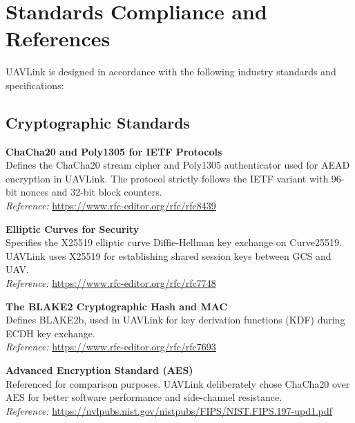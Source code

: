 \documentclass[11pt,a4paper]{article}
\begin{document}
\section{Standards Compliance and References}

UAVLink is designed in accordance with the following industry standards and specifications:

\subsection{Cryptographic Standards}

\begin{description}[style=nextline]
\item[RFC 8439] \textbf{ChaCha20 and Poly1305 for IETF Protocols} \\
Defines the ChaCha20 stream cipher and Poly1305 authenticator used for AEAD encryption in UAVLink. The protocol strictly follows the IETF variant with 96-bit nonces and 32-bit block counters.\\
\textit{Reference:} \url{https://www.rfc-editor.org/rfc/rfc8439}

\item[RFC 7748] \textbf{Elliptic Curves for Security} \\
Specifies the X25519 elliptic curve Diffie-Hellman key exchange on Curve25519. UAVLink uses X25519 for establishing shared session keys between GCS and UAV.\\
\textit{Reference:} \url{https://www.rfc-editor.org/rfc/rfc7748}

\item[RFC 7693] \textbf{The BLAKE2 Cryptographic Hash and MAC} \\
Defines BLAKE2b, used in UAVLink for key derivation functions (KDF) during ECDH key exchange.\\
\textit{Reference:} \url{https://www.rfc-editor.org/rfc/rfc7693}

\item[FIPS 197] \textbf{Advanced Encryption Standard (AES)} \\
Referenced for comparison purposes. UAVLink deliberately chose ChaCha20 over AES for better software performance and side-channel resistance.\\
\textit{Reference:} \url{https://nvlpubs.nist.gov/nistpubs/FIPS/NIST.FIPS.197-upd1.pdf}
\end{description}
\end{document}
